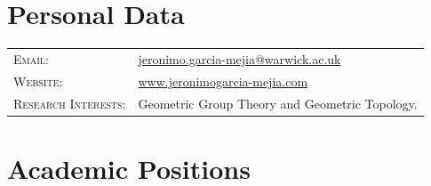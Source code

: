 \documentclass[a4paper,10pt]{article} %
\begin{document}
\pagestyle{empty} %


\par{\bigskip\par} %

\section{Personal Data}

\begin{longtable}{>{\raggedleft\arraybackslash}p{4cm}p{10cm}}
\textsc{Email:} & \href{mailto:Jeronimo.Garcia-Mejia@warwick.ac.uk}{jeronimo.garcia-mejia@warwick.ac.uk}\\
\textsc{Website:} & \href{https://jeronimogarcia-mejia.com}{www.jeronimogarcia-mejia.com} \\
\textsc{Research Interests:} & Geometric Group Theory and Geometric Topology. %
\end{longtable}

\section{Academic Positions}


%
%
%
\end{document}
